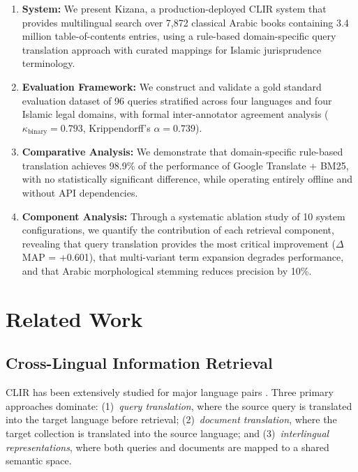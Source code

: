 \documentclass[preprint,12pt,authoryear]{elsarticle}
\begin{document}
\begin{enumerate}
    \item \textbf{System:} We present Kizana, a production-deployed CLIR system that provides multilingual search over 7,872 classical Arabic books containing 3.4 million table-of-contents entries, using a rule-based domain-specific query translation approach with curated mappings for Islamic jurisprudence terminology.

    \item \textbf{Evaluation Framework:} We construct and validate a gold standard evaluation dataset of 96 queries stratified across four languages and four Islamic legal domains, with formal inter-annotator agreement analysis ($\kappa_{\text{binary}} = 0.793$, Krippendorff's $\alpha = 0.739$).

    \item \textbf{Comparative Analysis:} We demonstrate that domain-specific rule-based translation achieves 98.9\% of the performance of Google Translate + BM25, with no statistically significant difference, while operating entirely offline and without API dependencies.

    \item \textbf{Component Analysis:} Through a systematic ablation study of 10 system configurations, we quantify the contribution of each retrieval component, revealing that query translation provides the most critical improvement ($\Delta$MAP = +0.601), that multi-variant term expansion degrades performance, and that Arabic morphological stemming reduces precision by 10\%.
\end{enumerate}

\section{Related Work}
\label{sec:related}

\subsection{Cross-Lingual Information Retrieval}

CLIR has been extensively studied for major language pairs \citep{nie2010cross,zhou2012cross}. Three primary approaches dominate: (1)~\textit{query translation}, where the source query is translated into the target language before retrieval; (2)~\textit{document translation}, where the target collection is translated into the source language; and (3)~\textit{interlingual representations}, where both queries and documents are mapped to a shared semantic space.
\end{document}
